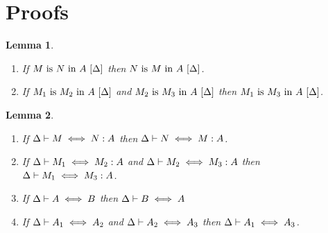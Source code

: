 \documentclass{article}
\theoremstyle{break}
\newtheorem{lemma}{Lemma}
\begin{document}
\section{Proofs}

\begin{lemma}
\begin{enumerate}
\item
If ${M}\mathrm{\ is\ }{N}\mathrm{\ in\ }{A}\ [\Delta]$ then
${N}\mathrm{\ is\ }{M}\mathrm{\ in\ }{A}\ [\Delta]$.
\item
If ${M_1}\mathrm{\ is\ }{M_2}\mathrm{\ in\ }{A}\ [\Delta]$ and
${M_2}\mathrm{\ is\ }{M_3}\mathrm{\ in\ }{A}\ [\Delta]$ then
${M_1}\mathrm{\ is\ }{M_3}\mathrm{\ in\ }{A}\ [\Delta]$.
\end{enumerate}
\end{lemma}

\begin{lemma}
\begin{enumerate}
\item
If $\Delta\vdash M \iff N : A$ then
$\Delta\vdash N \iff M : A$.
\item
If $\Delta\vdash M_1 \iff M_2 : A$ and
$\Delta\vdash M_2 \iff M_3 : A$ then
$\Delta\vdash M_1 \iff M_3 : A$.
\item
If $\Delta\vdash A \iff B$ then
$\Delta\vdash B \iff A$
\item
If $\Delta\vdash A_1 \iff A_2$ and
$\Delta\vdash A_2 \iff A_3$ then
$\Delta\vdash A_1 \iff A_3$.
\end{enumerate}
\end{lemma}
\end{document}
